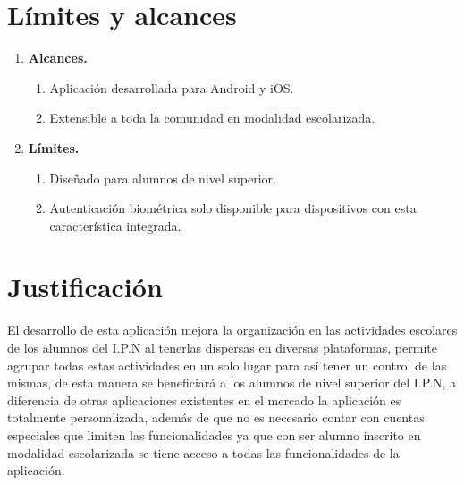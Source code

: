 \documentclass[10pt]{article}
\begin{document}
\section{Límites y alcances}

\begin{enumerate}
    \item \textbf{Alcances.}

\begin{enumerate}
\item Aplicación desarrollada para  Android y iOS.
\item Extensible a toda la comunidad en modalidad escolarizada.
\end {enumerate}

  \item  \textbf{Límites.}

\begin{enumerate}
\item Diseñado para  alumnos de nivel superior.
\item Autenticación biométrica solo disponible para dispositivos con esta característica integrada.
\end {enumerate}
\end{enumerate}


\section{Justificación}
\justify
El desarrollo de esta aplicación mejora la organización en las actividades escolares de los alumnos del I.P.N al tenerlas dispersas en diversas plataformas, permite agrupar todas estas actividades en un solo lugar para así tener un control de las mismas, de esta manera se beneficiará a los alumnos de nivel superior del I.P.N, a diferencia de otras aplicaciones existentes en el mercado la aplicación es totalmente personalizada, además de que no es necesario contar con cuentas especiales  que limiten las funcionalidades ya que con ser alumno inscrito en modalidad escolarizada se tiene acceso a todas las funcionalidades de la aplicación. 

\end{document}
